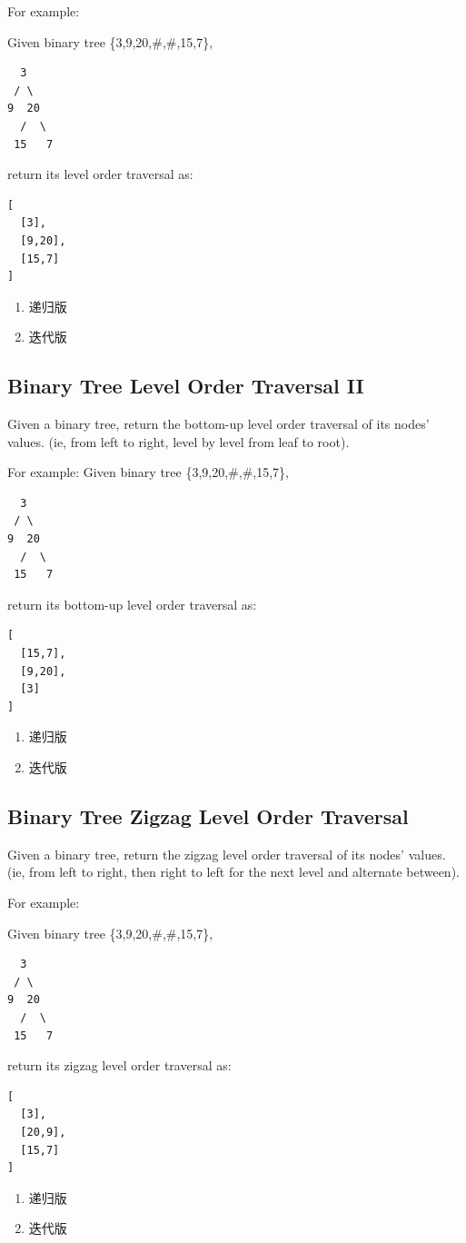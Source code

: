 \documentclass[12pt]{book}
\begin{document}
For example:

Given binary tree \{3,9,20,\#,\#,15,7\},
\lstset{language=java,label= ,caption= ,numbers=none}
\begin{lstlisting}
  3
 / \
9  20
  /  \
 15   7
\end{lstlisting}
return its level order traversal as:
\lstset{language=java,label= ,caption= ,numbers=none}
\begin{lstlisting}
[
  [3],
  [9,20],
  [15,7]
]
\end{lstlisting}
\begin{enumerate}
\item 递归版
\label{sec-4-2-4-1}
\item 迭代版
\label{sec-4-2-4-2}
\end{enumerate}

\subsection{Binary Tree Level Order Traversal II}
\label{sec-4-2-5}
Given a binary tree, return the bottom-up level order traversal of its nodes' values. (ie, from left to right, level by level from leaf to root).

For example:
Given binary tree \{3,9,20,\#,\#,15,7\},
\lstset{language=java,label= ,caption= ,numbers=none}
\begin{lstlisting}
  3
 / \
9  20
  /  \
 15   7
\end{lstlisting}
return its bottom-up level order traversal as:
\lstset{language=java,label= ,caption= ,numbers=none}
\begin{lstlisting}
[
  [15,7],
  [9,20],
  [3]
]
\end{lstlisting}
\begin{enumerate}
\item 递归版
\label{sec-4-2-5-1}
\item 迭代版
\label{sec-4-2-5-2}
\end{enumerate}


\subsection{Binary Tree Zigzag Level Order Traversal}
\label{sec-4-2-6}
Given a binary tree, return the zigzag level order traversal of its nodes' values. (ie, from left to right, then right to left for the next level and alternate between).

For example:

Given binary tree \{3,9,20,\#,\#,15,7\},
\lstset{language=java,label= ,caption= ,numbers=none}
\begin{lstlisting}
  3
 / \
9  20
  /  \
 15   7
\end{lstlisting}
return its zigzag level order traversal as:
\lstset{language=java,label= ,caption= ,numbers=none}
\begin{lstlisting}
[
  [3],
  [20,9],
  [15,7]
]
\end{lstlisting}
\begin{enumerate}
\item 递归版
\label{sec-4-2-6-1}
\item 迭代版
\label{sec-4-2-6-2}
\end{enumerate}
\end{document}
